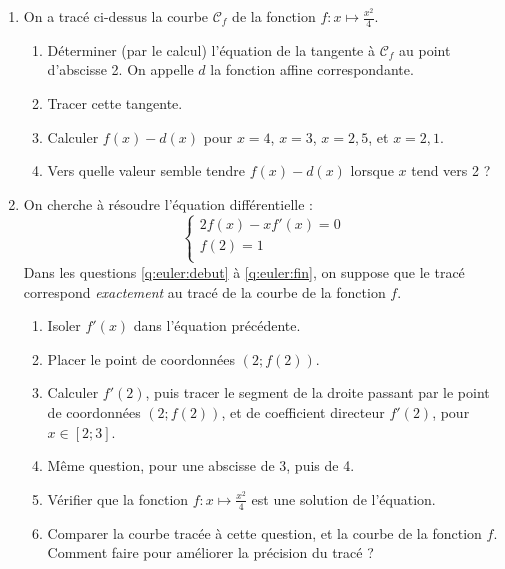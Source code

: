 \documentclass[11pt]{article}
\begin{document}
\begin{exercice}
  \begin{enumerate}
    \item On a tracé ci-dessus la courbe $\mathcal{C}_f$ de la fonction $f:x\mapsto \frac{x^2}{4}$.
      \begin{enumerate}
        \item Déterminer (par le calcul) l'équation de la tangente à $\mathcal{C}_f$ au point d'abscisse 2. On appelle $d$ la fonction affine correspondante.
        \item Tracer cette tangente.
        \item Calculer $f(x)-d(x)$ pour $x=4$, $x=3$, $x=2,5$, et $x=2,1$.
        \item Vers quelle valeur semble tendre $f\left( x \right)-d\left( x \right)$ lorsque $x$ tend vers 2 ?
      \end{enumerate}
    \item On cherche à résoudre l'équation différentielle :
      \[\left\{\begin{array}{l}
          2f\left( x \right)-xf'\left( x \right)=0\\
          f\left( 2 \right) = 1 \\
      \end{array}\right.\]
      Dans les questions \ref{q:euler:debut} à \ref{q:euler:fin}, on suppose que le tracé correspond \emph{exactement} au tracé de la courbe de la fonction $f$.
      \begin{enumerate}
        \item Isoler $f'\left( x \right)$ dans l'équation précédente.
        \item\label{q:euler:debut} Placer le point de coordonnées $\left( 2; f\left( 2 \right) \right)$.
        \item Calculer $f'\left( 2 \right)$, puis tracer le segment de la droite passant par le point de coordonnées $\left( 2; f\left( 2 \right) \right)$, et de coefficient directeur $f'(2)$, pour $x\in\left[ 2; 3 \right]$.
        \item\label{q:euler:fin} Même question, pour une abscisse de 3, puis de 4.
        \item Vérifier que la fonction $f:x\mapsto\frac{x^2}{4}$ est une solution de l'équation.
        \item Comparer la courbe tracée à cette question, et la courbe de la fonction $f$. Comment faire pour améliorer la précision du tracé ?
      \end{enumerate}

\end{enumerate}
\end{exercice}
\end{document}
